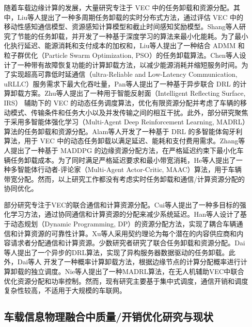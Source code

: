 随着车载边缘计算的发展，大量研究专注于 VEC 中的任务卸载和资源分配。其中，Liu等人\cite{liu2021rtds}提出了一种多周期任务卸载的实时分布式方法，通过评估 VEC 中的移动性感知通信模型、资源感知计算模型和截止时间感知奖励模型。Shang等人\cite{shang2021deep}研究了节能的任务卸载，并开发了一种基于深度学习的算法来最小化能耗。为了最小化执行延迟、能源消耗和支付成本的加权和，Liu等人\cite{liu2022a}提出了一种结合 ADMM 和粒子群优化（Particle Swarm Optimization, PSO）的任务卸载算法。Chen等人\cite{chen2020robust}设计了一种带有故障恢复功能的计算卸载方法，以减少能源消耗并缩短服务时间。为了实现超高可靠低时延通信（ultra-Reliable and Low-Latency Communication, uRLLC）服务需求下最大化吞吐量，Pan等人\cite{pan2022asynchronous}提出了一种基于异步联合 DRL 的计算卸载方案。Zhu等人\cite{zhu2022a}提出了一种用于智能反射面（Intelligent Reflecting Surface, IRS） 辅助下的 VEC 的动态任务调度算法，优化有限资源分配并考虑了车辆的移动模式、传输条件和任务大小以及并发传输之间的相互干扰。此外，部分研究聚焦于采用多智能体强化学习（Multi-Agent Deep Reinforcement Learning, MADRL）算法的任务卸载和资源分配。Alam等人\cite{alam2022multi}开发了一种基于 DRL 的多智能体匈牙利算法，用于 VEC 中的动态任务卸载以满足延迟、能耗和支付费用需求。Zhang等人\cite{zhang2021adaptive}提出了一种基于 MADDPG 的边缘资源分配方法，在严格延迟约束下最小化车辆任务卸载成本。为了同时满足严格延迟要求和最小带宽消耗，He等人\cite{he2021efficient}提出了一种多智能体行动者-评论家（Multi-Agent Actor-Critic, MAAC）算法，用于车辆带宽分配。然而，以上研究工作都没有考虑实时任务卸载和通信/计算资源分配的协同优化。

部分研究专注于VEC的联合通信和计算资源分配。Cui等人\cite{cui2021reinforcement}提出了一种多目标的强化学习方法，通过协同通信和计算资源的分配来减少系统延迟。Han等人\cite{han2020reliability}设计了基于动态规划（Dynamic Programming, DP）的资源分配方法，实现了耦合车辆通信和计算资源的可靠性计算。Xu等人\cite{xu2021socially}采用契约理论为每个潜在的内容供应商和内容请求者分配通信和计算资源。少数研究者研究了联合任务卸载和资源分配。Dai等人\cite{dai2021asynchronous}提出了一个异步的DRL算法，实现了异构服务器数据驱动的任务卸载。此外，Dai等人 \cite{dai2022a}开发了一种概率计算卸载方法，根据边缘节点的计算分配概率进行计算卸载的独立调度。Nie等人\cite{nie2021semi}提出了一种MADRL算法，在无人机辅助VEC中联合优化资源分配和功率控制。然而，现有研究主要基于集中式调度，通信开销和调度复杂性较高，不适用于大规模的车联网。

\subsection{车载信息物理融合中质量/开销优化研究与现状}

